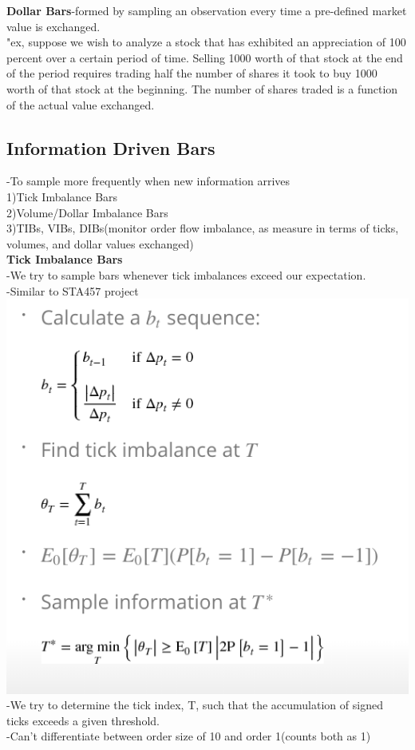 \documentclass{article}
\begin{document}
\textbullet\textbf{Dollar Bars}-formed by sampling an observation every time a pre-defined market value is exchanged.\\ 
"ex, suppose we wish to analyze a stock that has exhibited an appreciation of 100 percent over a certain period of time.  Selling 1000 worth of that stock at the end of the period requires trading half the number of shares it took to buy 1000 worth of that stock at the beginning.  The number of shares traded is a function of the actual value exchanged.\\ 
\subsection{Information Driven Bars}
-To sample more frequently when new information arrives \\ 
1)Tick Imbalance Bars\\ 
2)Volume/Dollar Imbalance Bars\\ 
3)TIBs, VIBs, DIBs(monitor order flow imbalance, as measure in terms of ticks, volumes, and dollar values exchanged)\\ 

\textbullet \textbf{Tick Imbalance Bars}\\ 
-We try to sample bars whenever tick imbalances exceed our expectation.\\ 
-Similar to STA457 project \\ 
\includegraphics[width=\textwidth]{TickimbalanceBars.png}\\ 
-We try to determine the tick index, T, such that the accumulation of signed ticks exceeds a given threshold.\\ 
-Can't differentiate between order size of 10 and order 1(counts both as 1)\\ 
\end{document}
